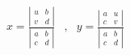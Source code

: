 \begin{align*}
 x=\frac{
  \left \vert
    \begin{array}{cc}
      u & b \\
      v & d
    \end{array}
  \right \vert
}{
\left \vert \begin{array}{cc}
 a & b \\
 c & d
\end{array}
\right \vert
}
&,&
 y=\frac{
\left \vert \begin{array}{cc}
 a & u \\
 c & v
\end{array}
\right \vert
}{
\left \vert \begin{array}{cc}
 a & b \\
 c & d
\end{array}
\right \vert
}
\end{align*}

